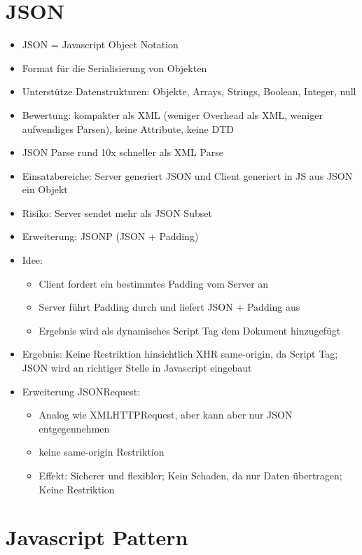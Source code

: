 \documentclass{article} %
\begin{document}
	
	
	\section{JSON}
	\begin{itemize}
		\item JSON = Javascript Object Notation
		\item Format für die Serialisierung von Objekten
		\item Unterstütze Datenstrukturen: Objekte, Arrays, Strings, Boolean, Integer, null
		\item Bewertung: kompakter als XML (weniger Overhead als XML, weniger aufwendiges Parsen), keine Attribute, keine DTD
		\item JSON Parse rund 10x schneller als XML Parse
		\item Einsatzbereiche: Server generiert JSON und Client generiert in JS aus JSON ein Objekt
		\item Risiko: Server sendet mehr als JSON Subset
		\item Erweiterung: JSONP (JSON + Padding)
		\item Idee: 
		\begin{itemize}
			\item Client fordert ein bestimmtes Padding vom Server an
			\item Server führt Padding durch und liefert JSON + Padding aus
			\item Ergebnis wird als dynamisches Script Tag dem Dokument hinzugefügt
		\end{itemize}
		\item Ergebnis: Keine Restriktion hinsichtlich XHR same-origin, da Script Tag; JSON wird an richtiger Stelle in Javascript eingebaut
		\item Erweiterung JSONRequest:
		\begin{itemize}
			\item Analog wie XMLHTTPRequest, aber kann aber nur JSON entgegennehmen
			\item keine same-origin Restriktion
			\item Effekt: Sicherer und flexibler; Kein Schaden, da nur Daten übertragen; Keine Restriktion
		\end{itemize}
		
	\end{itemize}
	
	
	
	\section{Javascript Pattern}
\end{document}
